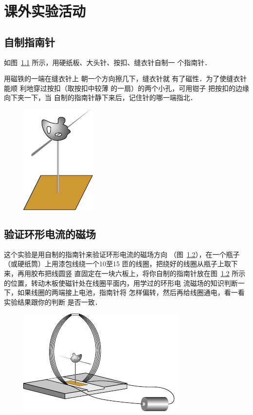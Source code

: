 \chapter{课外实验活动}

\section{自制指南针}
如图~\ref{fig_C_10-10} 所示，用硬纸板、大头针、按扣、缝衣针自制一
个指南针．

用磁铁的一端在缝衣针上
朝一个方向擦几下，缝衣针就
有了磁性．为了使缝衣针能顺
利地穿过按扣（取按扣中较薄
的一扇）的两个小孔，可用钳子
把按扣的边缘向下夹一下，当
自制的指南针静下来后，记住针的哪一端指北．

\begin{figure}[htbp]
    \centering
    \includegraphics{fig/C/10-10.pdf}
    \caption{}\label{fig_C_10-10}
\end{figure}


\section{验证环形电流的磁场}
这个实验是用自制的指南针来验证环形电流的磁场方向
（图~\ref{fig_C_10-11}），在一个瓶子（或硬纸筒）上用漆包线绕一个10至15
匝的线圈，把绕好的线圈从瓶子上取下来，再用胶布把线圆竖
直固定在一块六板上，将你自制的指南针放在图~\ref{fig_C_10-11} 所示
的位置，转动木板使磁针处在线圈平面内，用学过的环形电
流磁场的知识判断一下，如果线圈的两端接上电池，指南针将
怎样偏转，然后再给线圈通电，看一看实验结果跟你的判断
是否一致．
\begin{figure}[htbp]
    \centering
    \includegraphics{fig/C/10-11.pdf}
    \caption{}\label{fig_C_10-11}
\end{figure}

